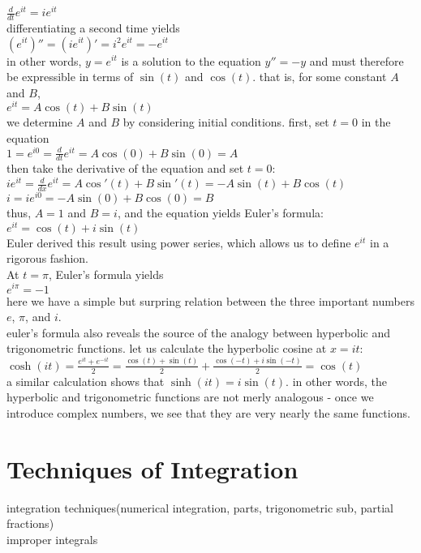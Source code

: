 \documentclass{article}
\begin{document}
$\frac{d}{dt}e^{it} = ie^{it}$\\
differentiating a second time yields\\
$(e^{it})'' = (ie^{it})' = i^2e^{it} = -e^{it}$\\
in other words, $y = e^{it}$ is a solution to the equation $y'' = -y$ and must therefore be expressible in terms of $\sin(t)$ and $\cos(t)$. that is, for some constant $A$ and $B$,\\
$e^{it} = A\cos(t) + B\sin(t)$\\
we determine $A$ and $B$ by considering initial conditions. first, set $t = 0$ in the equation\\
$1 = e^{i0} = \frac{d}{dt}e^{it} = A\cos(0) + B\sin(0) = A$\\
then take the derivative of the equation and set $t = 0$:\\
$ie^{it} = \frac{d}{dx}e^{it} = A\cos'(t) + B\sin'(t) = -A\sin(t) + B\cos(t)$\\
$i = ie^{i0} = -A\sin(0) + B\cos(0) = B$\\
thus, $A = 1$ and $B = i$, and the equation yields Euler's formula:\\
$e^{it} = \cos(t) + i\sin(t)$\\
Euler derived this result using power series, which allows us to define $e^{it}$ in a rigorous fashion.\\ At $t = \pi$, Euler's formula yields\\
$e^{i\pi} = -1$\\
here we have a simple but surpring relation between the three important numbers $e$, $\pi$, and $i$.\\ euler's formula also reveals the source of the analogy between hyperbolic and trigonometric functions. let us calculate the hyperbolic cosine at $x = it$:\\
$\cosh(it) = \frac{e^{it} + e^{-it}}{2} = \frac{\cos(t) + \sin(t)}{2} + \frac{\cos(-t) + i\sin(-t)}{2} = \cos(t)$\\
a similar calculation shows that $\sinh(it) = i\sin(t)$. in other words, the hyperbolic and trigonometric functions are not merly analogous - once we introduce complex numbers, we see that they are very nearly the same functions.\\

\section*{Techniques of Integration}
integration techniques(numerical integration, parts, trigonometric sub, partial fractions)\\
improper integrals\\
\end{document}
